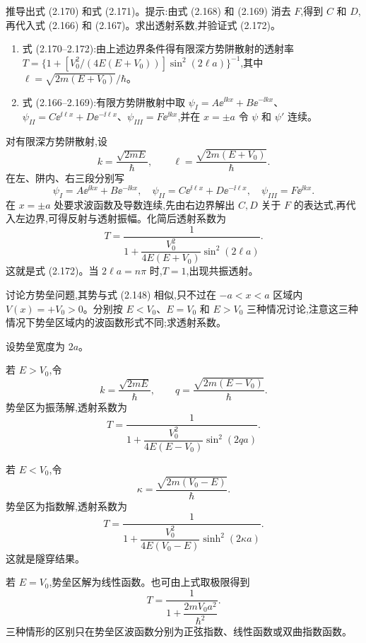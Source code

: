 \begin{question}
推导出式 (2.170) 和式 (2.171)。提示:由式 (2.168) 和 (2.169) 消去 $F$,得到 $C$ 和 $D$,再代入式 (2.166) 和 (2.167)。求出透射系数,并验证式 (2.172)。

\par\smallskip
{}
\begin{enumerate}[leftmargin=2.2em,itemsep=0.12em,topsep=0.12em,parsep=0pt]
\item 式 (2.170--2.172):由上述边界条件得有限深方势阱散射的透射率 $T=\{1+[V_0^2/(4E(E+V_0))]\sin^2(2\ell a)\}^{-1}$,其中 $\ell=\sqrt{2m(E+V_0)}/\hbar$。
\item 式 (2.166--2.169):有限方势阱散射中取 $\psi_I=A\ee^{\ii kx}+B\ee^{-\ii kx}$、$\psi_{II}=C\ee^{\ii\ell x}+D\ee^{-\ii\ell x}$、$\psi_{III}=F\ee^{\ii kx}$,并在 $x=\pm a$ 令 $\psi$ 和 $\psi'$ 连续。
\end{enumerate}

\begin{solution}
对有限深方势阱散射,设
\[
k=\frac{\sqrt{2mE}}{\hbar},
\qquad
\ell=\frac{\sqrt{2m(E+V_0)}}{\hbar}.
\]
在左、阱内、右三段分别写
\[
\psi_I=A\ee^{\ii kx}+B\ee^{-\ii kx},
\quad
\psi_{II}=C\ee^{\ii\ell x}+D\ee^{-\ii\ell x},
\quad
\psi_{III}=F\ee^{\ii kx}.
\]
在 $x=\pm a$ 处要求波函数及导数连续,先由右边界解出 $C,D$ 关于 $F$ 的表达式,再代入左边界,可得反射与透射振幅。化简后透射系数为
\[
T=\frac1{1+\dfrac{V_0^2}{4E(E+V_0)}\sin^2(2\ell a)}.
\]
这就是式 (2.172)。当 $2\ell a=n\pi$ 时,$T=1$,出现共振透射。
\end{solution}
\end{question}

\begin{question}
讨论方势垒问题,其势与式 (2.148) 相似,只不过在 $-a<x<a$ 区域内 $V(x)=+V_0>0$。分别按 $E<V_0$、$E=V_0$ 和 $E>V_0$ 三种情况讨论,注意这三种情况下势垒区域内的波函数形式不同;求透射系数。

\par\smallskip
{}

\begin{solution}
设势垒宽度为 $2a$。

若 $E>V_0$,令
\[
k=\frac{\sqrt{2mE}}{\hbar},
\qquad
q=\frac{\sqrt{2m(E-V_0)}}{\hbar}.
\]
势垒区为振荡解,透射系数为
\[
T=\frac1{1+\dfrac{V_0^2}{4E(E-V_0)}\sin^2(2qa)}.
\]

若 $E<V_0$,令
\[
\kappa=\frac{\sqrt{2m(V_0-E)}}{\hbar}.
\]
势垒区为指数解,透射系数为
\[
T=\frac1{1+\dfrac{V_0^2}{4E(V_0-E)}\sinh^2(2\kappa a)}.
\]
这就是隧穿结果。

若 $E=V_0$,势垒区解为线性函数。也可由上式取极限得到
\[
T=\frac1{1+\dfrac{2mV_0a^2}{\hbar^2}}.
\]
三种情形的区别只在势垒区波函数分别为正弦指数、线性函数或双曲指数函数。
\end{solution}
\end{question}

